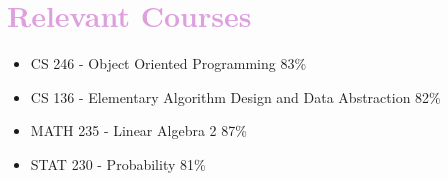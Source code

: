 \documentclass{article}
\begin{document}
\section*{\Large {\textcolor{Plum} {Relevant Courses}}} 
			\begin{itemize}[label={\color{Plum} \faCaretRight}]
			\itemsep0em
			\item CS 246 - Object Oriented Programming {\small {\color{Plum} 83\%}}
			\item CS 136 - Elementary Algorithm Design and Data Abstraction {\small {\color{Plum} 82\%}}
			\item MATH 235 - Linear Algebra 2 {\small {\color{Plum} 87\%}}
			\item STAT 230 - Probability {\small {\color{Plum} 81\%}}
			\end{itemize}
			
\end{document}
